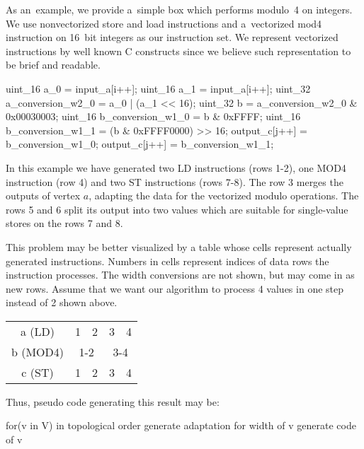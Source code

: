 As an~example, we provide a~simple box which performs modulo~4 on integers. We use nonvectorized store and load instructions and a~vectorized mod4 instruction on 16~bit integers as our instruction set. We represent vectorized instructions by well known C constructs since we believe such representation to be brief and readable.


\begin{code}
uint_16 a_0 = input_a[i++];
uint_16 a_1 = input_a[i++];
uint_32 a_conversion_w2_0 = a_0 | (a_1 << 16);
uint_32 b = a_conversion_w2_0 & 0x00030003;
uint_16 b_conversion_w1_0 = b & 0xFFFF;
uint_16 b_conversion_w1_1 = (b & 0xFFFF0000) >> 16;
output_c[j++] = b_conversion_w1_0;
output_c[j++] = b_conversion_w1_1;
\end{code}

In this example we have generated two LD instructions (rows 1-2), one MOD4 instruction (row 4) and two ST instructions (rows 7-8). The row 3 merges the outputs of vertex $a$, adapting the data for the vectorized modulo operations. The rows 5 and 6 split its output into two values which are suitable for single-value stores on the rows 7 and 8.


This problem may be better visualized by a table whose cells represent actually generated instructions. Numbers in cells represent indices of data rows the instruction processes. The width conversions are not shown, but may come in as new rows. Assume that we want our algorithm to process 4 values in one step instead of 2 shown above.

\begin{center}
\begin{tabular}{c|c|c|c|c|}
  \cline{2-5}
a (LD) & 1 & 2 & 3 & 4\\
  \cline{2-5}
b (MOD4) & \multicolumn{2}{c|}{1-2} & \multicolumn{2}{c|}{3-4}\\
  \cline{2-5}
c (ST) & 1 & 2 & 3 & 4\\
  \cline{2-5}
\end{tabular}
\end{center}

Thus, pseudo code generating this result may be:

\begin{code}
for(v in V) in topological order
{
  generate adaptation for width of v
  generate code of v
}
\end{code}

